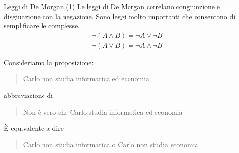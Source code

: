 \documentclass[10pt,dvipsnames]{beamer}
\begin{document}
\begin{frame}{Leggi di De Morgan (1)}
    Le leggi di De Morgan correlano congiunzione e disgiunzione con la negazione. Sono leggi molto importanti che consentono di semplificare le \fp complesse.
    \begin{gather*}
        \neg (A \wedge B) = \neg A \vee \neg B\\
        \neg (A \vee B) = \neg A \wedge \neg B
    \end{gather*}

    \begin{example}
        Consideriamo la proposizione:
        \begin{quote}
            Carlo non studia informatica ed economia
        \end{quote}
        abbreviazione di
        \begin{quote}
            Non è vero che Carlo studia informatica ed economia
        \end{quote}
        È equivalente a dire
        \begin{quote}
            Carlo non studia informatica o Carlo non studia economia
        \end{quote}
    \end{example}
\end{frame}





\end{document}
